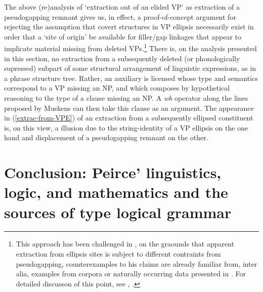 \documentclass[output=paper,colorlinks,citecolor=brown]{langscibook}
\begin{document}
The above (re)analysis of `extraction out of an elided VP' as
extraction of a pseudogapping remnant gives us, in effect, a
proof-of-concept argument for rejecting the assumption that covert
structures in VP ellipsis necessarily exist in order that a `site of
origin' be available for filler/gap linkages that appear to implicate
material missing from deleted VPs.\footnote{This approach has been
challenged in \citet{johnson2001}, on the graounds that apparent extraction
from ellipsis sites is subject to different contraints from
pseudogapping, counterexamples to his claims are already familiar
from, inter alia, examples from corpora or naturally occurring data
presented in \citet{levin-diss}. For detailed discusson of this point, see
\citet{kubotalevineBook}, .} There is, on the analysis
presented in this section, no extraction from a subsequently deleted
(or phonologically supressed) subpart of some structural arrangement
of linguistic expressions, as in a phrase structure tree. Rather, an
auxiliary is licensed whose type and semantics correspond to a VP
missing an NP, and which composes by hypothetical reasoning to the
type of a clause missing an NP. A \textit{wh} operator along the lines
proposed by Muskens can then take this clause as an argument. The
appearance in (\ref{extrac-from-VPE}) of an extraction from a subsequently
ellipsed constituent is, on this view, a illusion due to the
string-identity of a VP ellipsis on the one hand and displacement of a
pseudogapping remnant on the other.

\section{Conclusion: Peirce' linguistics, logic, and mathematics and the sources of type logical grammar}
\end{document}
